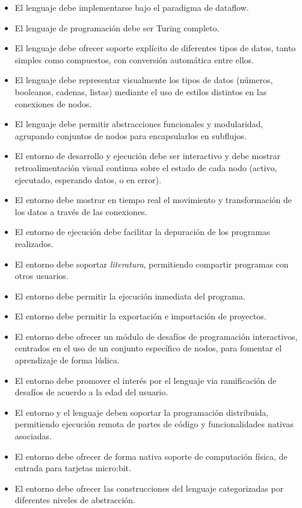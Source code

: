\begin{itemize}
  \item El lenguaje debe implementarse bajo el paradigma de dataflow.
  \item El lenguaje de programación debe ser Turing completo.
  \item El lenguaje debe ofrecer soporte explícito de diferentes tipos de datos, tanto simples como compuestos, con conversión automática entre ellos.
  \item El lenguaje debe representar visualmente los tipos de datos (números, booleanos, cadenas, listas) mediante el uso de estilos distintos en las conexiones de nodos.
  \item El lenguaje debe permitir abstracciones funcionales y modularidad, agrupando conjuntos de nodos para encapsularlos en subflujos.
  \item El entorno de desarrollo y ejecución debe ser interactivo y debe mostrar retroalimentación visual continua sobre el estado de cada nodo (activo, ejecutado, esperando datos, o en error).
  \item El entorno debe mostrar en tiempo real el movimiento y transformación de los datos a través de las conexiones.
  \item El entorno de ejecución debe facilitar la depuración de los programas realizados.
  \item El entorno debe soportar \emph{literatura}, permitiendo compartir programas con otros usuarios.
  \item El entorno debe permitir la ejecución inmediata del programa.
  \item El entorno debe permitir la exportación e importación de proyectos.
  \item El entorno debe ofrecer un módulo de desafíos de programación interactivos, centrados en el uso de un conjunto específico de nodos, para fomentar el aprendizaje de forma lúdica.
  \item El entorno debe promover el interés por el lenguaje via ramificación de desafíos de acuerdo a la edad del usuario.
  \item El entorno y el lenguaje deben soportar la programación distribuida, permitiendo ejecución remota de partes de código y funcionalidades nativas asociadas.
  \item El entorno debe ofrecer de forma nativa soporte de computación física, de entrada para tarjetas micro:bit.
  \item El entorno debe ofrecer las construcciones del lenguaje categorizadas por diferentes niveles de abstracción.
\end{itemize}

